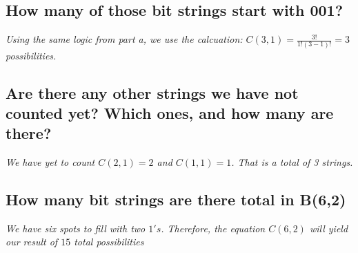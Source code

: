 \documentclass{article}
\begin{document}
\subsection{How many of those bit strings start with 001?}
\hspace{1cm}\textit{Using the same logic from part a, we use the calcuation:
        $C(3,1) = \frac{3!}{1!(3-1)!} = 3$ possibilities.}
\subsection{Are there any other strings we have not counted yet? Which ones, and how many are there?}
\hspace{1cm}\textit{We have yet to count $C(2,1)=2$ and $C(1,1)=1$. That is a total of 3 strings.}
\subsection{How many bit strings are there total in B(6,2)}
\hspace{1cm}\textit{We have six spots to fill with two $1's$. Therefore, the equation
    $C(6,2)$ will yield our result of $15$ total possibilities}
\end{document}

